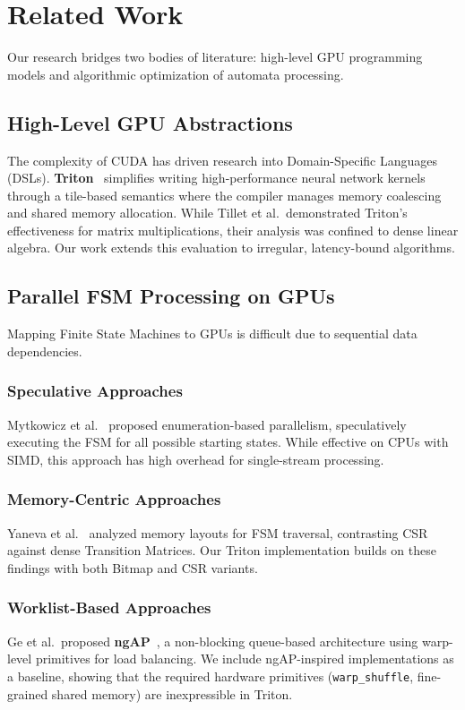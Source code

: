 \section{Related Work}\label{sec:soa}

Our research bridges two bodies of literature: high-level GPU programming models and algorithmic optimization of automata processing.

\subsection{High-Level GPU Abstractions}

The complexity of CUDA has driven research into Domain-Specific Languages (DSLs).
\textbf{Triton}~\cite{triton} simplifies writing high-performance neural network kernels through a tile-based semantics where the compiler manages memory coalescing and shared memory allocation.
While Tillet et al.\ demonstrated Triton's effectiveness for matrix multiplications, their analysis was confined to dense linear algebra. Our work extends this evaluation to irregular, latency-bound algorithms.

\subsection{Parallel FSM Processing on GPUs}

Mapping Finite State Machines to GPUs is difficult due to sequential data dependencies.

\subsubsection{Speculative Approaches}
Mytkowicz et al.~\cite{mytkowicz2014} proposed enumeration-based parallelism, speculatively executing the FSM for all possible starting states. While effective on CPUs with SIMD, this approach has high overhead for single-stream processing.

\subsubsection{Memory-Centric Approaches}
Yaneva et al.~\cite{yaneva2017} analyzed memory layouts for FSM traversal, contrasting CSR against dense Transition Matrices. Our Triton implementation builds on these findings with both Bitmap and CSR variants.

\subsubsection{Worklist-Based Approaches}
Ge et al.\ proposed \textbf{ngAP}~\cite{ngap}, a non-blocking queue-based architecture using warp-level primitives for load balancing. We include ngAP-inspired implementations as a baseline, showing that the required hardware primitives (\texttt{warp\_shuffle}, fine-grained shared memory) are inexpressible in Triton.

